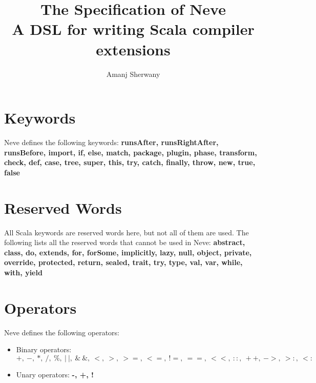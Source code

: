\documentclass[12pt]{article}
\newcommand{\dsl}{Neve\xspace}
\begin{document}
\title{The Specification of \dsl\\
  \large{A DSL for writing Scala compiler extensions}}
\author{Amanj Sherwany}
  
  
  
\maketitle
\section{Keywords}

\raggedright
\dsl defines the following keywords: \textbf{runsAfter, runsRightAfter, runsBefore,
  import, if, else, match, package, plugin, phase, transform, check, def, case,
  tree, super, this, try, catch, finally, throw, new, true, false}

\section{Reserved Words}

All Scala keywords are reserved words here, but not all of them are used. The
following lists all the reserved words that cannot be used in \dsl:
\textbf{abstract, class, do, extends, for, forSome, implicitly, lazy, null,
  object, private, override, protected, return, sealed, trait, try, type, val,
  var, while, with, yield}


\section{Operators}
\dsl defines the following operators:

\begin{itemize}
  \item Binary operators: $+,~-,~*,~/,~\%,~|~|,~\&~\&,~
    <,~>,~>=,~<=,~!=,~==,~<<,~::,~++,~->,~>:,~<:$
  \item Unary operators: \textbf{-, +, !}
\end{itemize}
  

\newpage
\end{document}
